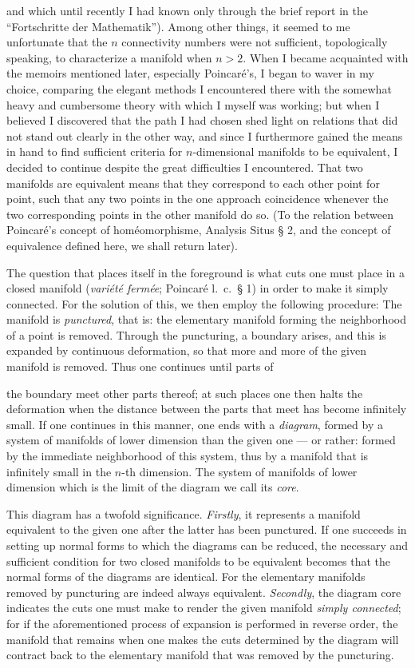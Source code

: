 \documentclass{article}
\begin{document}
and which until recently I had known only through the brief report in the “Fortschritte der Mathematik”). Among other things, it seemed to me unfortunate that the $n$ connectivity numbers were not sufficient, topologically speaking, to characterize a manifold when $n > 2$. When I became acquainted with the memoirs mentioned later, especially Poincaré's, I began to waver in my choice, comparing the elegant methods I encountered there with the somewhat heavy and cumbersome theory with which I myself was working; but when I believed I discovered that the path I had chosen shed light on relations that did not stand out clearly in the other way, and since I furthermore gained the means in hand to find sufficient criteria for $n$-dimensional manifolds to be equivalent, I decided to continue despite the great difficulties I encountered. That two manifolds are equivalent means that they correspond to each other point for point, such that any two points in the one approach coincidence whenever the two corresponding points in the other manifold do so. (To the relation between Poincaré's concept of homéomorphisme, Analysis Situs § 2, and the concept of equivalence defined here, we shall return later).

The question that places itself in the foreground is what cuts one must place in a closed manifold (\emph{variété fermée}; Poincaré l.~c.\ § 1) in order to make it simply connected. For the solution of this, we then employ the following procedure: The manifold is \emph{punctured}, that is: the elementary manifold forming the neighborhood of a point is removed. Through the puncturing, a boundary arises, and this is expanded by continuous deformation, so that more and more of the given manifold is removed. Thus one continues until parts of

the boundary meet other parts thereof; at such places one then halts the deformation when the distance between the parts that meet has become infinitely small. If one continues in this manner, one ends with a \emph{diagram}, formed by a system of manifolds of lower dimension than the given one --- or rather: formed by the immediate neighborhood of this system, thus by a manifold that is infinitely small in the $n$-th dimension. The system of manifolds of lower dimension which is the limit of the diagram we call its \emph{core}.

This diagram has a twofold significance. \emph{Firstly}, it represents a manifold equivalent to the given one after the latter has been punctured. If one succeeds in setting up normal forms to which the diagrams can be reduced, the necessary and sufficient condition for two closed manifolds to be equivalent becomes that the normal forms of the diagrams are identical. For the elementary manifolds removed by puncturing are indeed always equivalent. \emph{Secondly}, the diagram core indicates the cuts one must make to render the given manifold \emph{simply connected}; for if the aforementioned process of expansion is performed in reverse order, the manifold that remains when one makes the cuts determined by the diagram will contract back to the elementary manifold that was removed by the puncturing.
\end{document}
